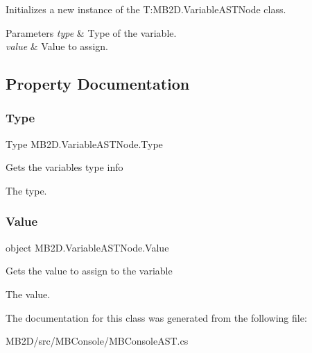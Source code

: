 Initializes a new instance of the T\+:\+M\+B2\+D.\+Variable\+A\+S\+T\+Node class. 


\begin{DoxyParams}{Parameters}
{\em type} & Type of the variable.\\
\hline
{\em value} & Value to assign.\\
\hline
\end{DoxyParams}


\subsection{Property Documentation}
\hypertarget{class_m_b2_d_1_1_variable_a_s_t_node_a32549a5361b7664b945b4d9537a5b454}{}\label{class_m_b2_d_1_1_variable_a_s_t_node_a32549a5361b7664b945b4d9537a5b454} 
\subsubsection{\texorpdfstring{Type}{Type}}
{\footnotesize\ttfamily Type M\+B2\+D.\+Variable\+A\+S\+T\+Node.\+Type\hspace{0.3cm}{\ttfamily [get]}}



Gets the variables type info 

The type.\hypertarget{class_m_b2_d_1_1_variable_a_s_t_node_ac96eab1a60b3cfab45a718ff87473a4f}{}\label{class_m_b2_d_1_1_variable_a_s_t_node_ac96eab1a60b3cfab45a718ff87473a4f} 
\subsubsection{\texorpdfstring{Value}{Value}}
{\footnotesize\ttfamily object M\+B2\+D.\+Variable\+A\+S\+T\+Node.\+Value\hspace{0.3cm}{\ttfamily [get]}}



Gets the value to assign to the variable 

The value.

The documentation for this class was generated from the following file\+:\begin{DoxyCompactItemize}
\item 
M\+B2\+D/src/\+M\+B\+Console/M\+B\+Console\+A\+S\+T.\+cs\end{DoxyCompactItemize}

